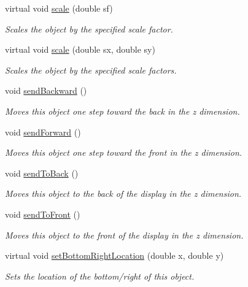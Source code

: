 \begin{DoxyCompactItemize}
virtual void \mbox{\hyperlink{classsgl_1_1GObject_ad2e1900f730475c2d044817db03b38d6}{scale}} (double sf)
\begin{DoxyCompactList}\small\item\em Scales the object by the specified scale factor. \end{DoxyCompactList}\item 
virtual void \mbox{\hyperlink{classsgl_1_1GObject_a63641f69d610d0b951357d35a0c3b1e3}{scale}} (double sx, double sy)
\begin{DoxyCompactList}\small\item\em Scales the object by the specified scale factors. \end{DoxyCompactList}\item 
void \mbox{\hyperlink{classsgl_1_1GObject_ab6747f40313c531c2db32edb5b63b9b7}{send\+Backward}} ()
\begin{DoxyCompactList}\small\item\em Moves this object one step toward the back in the {\itshape z} dimension. \end{DoxyCompactList}\item 
void \mbox{\hyperlink{classsgl_1_1GObject_a710b3e449c9facba7847c91ab170d281}{send\+Forward}} ()
\begin{DoxyCompactList}\small\item\em Moves this object one step toward the front in the {\itshape z} dimension. \end{DoxyCompactList}\item 
void \mbox{\hyperlink{classsgl_1_1GObject_a0f7f1efbb7fd46dde2867c4ad0330896}{send\+To\+Back}} ()
\begin{DoxyCompactList}\small\item\em Moves this object to the back of the display in the {\itshape z} dimension. \end{DoxyCompactList}\item 
void \mbox{\hyperlink{classsgl_1_1GObject_aee33d68488e46827ef55fac07f40a9b2}{send\+To\+Front}} ()
\begin{DoxyCompactList}\small\item\em Moves this object to the front of the display in the {\itshape z} dimension. \end{DoxyCompactList}\item 
virtual void \mbox{\hyperlink{classsgl_1_1GObject_a71ff7b16b8f1bdc4a1ce9f30cf8b87d8}{set\+Bottom\+Right\+Location}} (double x, double y)
\begin{DoxyCompactList}\small\item\em Sets the location of the bottom/right of this object. \end{DoxyCompactList}\item 

\end{DoxyCompactItemize}
